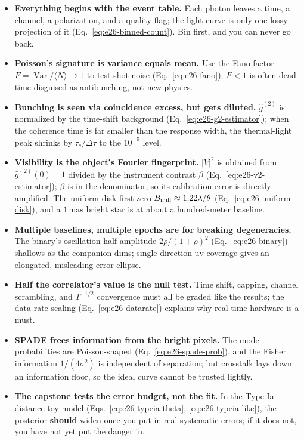 \begin{itemize}
  \item \textbf{Everything begins with the event table.} Each photon leaves a time, a channel, a polarization, and a quality flag; the light curve is only one lossy projection of it (Eq.\ \eqref{eq:e26-binned-count}). Bin first, and you can never go back.
  \item \textbf{Poisson's signature is variance equals mean.} Use the Fano factor \(F=\operatorname{Var}/\langle N\rangle\to1\) to test shot noise (Eq.\ \eqref{eq:e26-fano}); \(F<1\) is often dead-time disguised as antibunching, not new physics.
  \item \textbf{Bunching is seen via coincidence excess, but gets diluted.} \(\hat g^{(2)}\) is normalized by the time-shift background (Eq.\ \eqref{eq:e26-g2-estimator}); when the coherence time is far smaller than the response width, the thermal-light peak shrinks by \(\tau_c/\Delta\tau\) to the \(10^{-5}\) level.
  \item \textbf{Visibility is the object's Fourier fingerprint.} \(|V|^2\) is obtained from \(\hat g^{(2)}(0)-1\) divided by the instrument contrast \(\beta\) (Eq.\ \eqref{eq:e26-v2-estimator}); \(\beta\) is in the denominator, so its calibration error is directly amplified. The uniform-disk first zero \(B_{\rm null}\approx1.22\lambda/\theta\) (Eq.\ \eqref{eq:e26-uniform-disk}), and a \(1\,\mathrm{mas}\) bright star is at about a hundred-meter baseline.
  \item \textbf{Multiple baselines, multiple epochs are for breaking degeneracies.} The binary's oscillation half-amplitude \(2\rho/(1+\rho)^2\) (Eq.\ \eqref{eq:e26-binary}) shallows as the companion dims; single-direction uv coverage gives an elongated, misleading error ellipse.
  \item \textbf{Half the correlator's value is the null test.} Time shift, capping, channel scrambling, and \(T^{-1/2}\) convergence must all be graded like the results; the data-rate scaling (Eq.\ \eqref{eq:e26-datarate}) explains why real-time hardware is a must.
  \item \textbf{SPADE frees information from the bright pixels.} The mode probabilities are Poisson-shaped (Eq.\ \eqref{eq:e26-spade-prob}), and the Fisher information \(1/(4\sigma^2)\) is independent of separation; but crosstalk lays down an information floor, so the ideal curve cannot be trusted lightly.
  \item \textbf{The capstone tests the error budget, not the fit.} In the Type Ia distance toy model (Eqs.\ \eqref{eq:e26-typeia-theta}, \eqref{eq:e26-typeia-like}), the posterior \textbf{should} widen once you put in real systematic errors; if it does not, you have not yet put the danger in.
\end{itemize}

